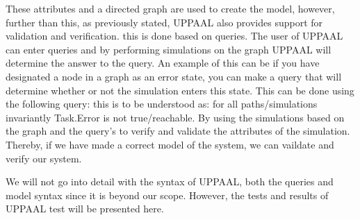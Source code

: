 These attributes and a directed graph are used to create the model, however, further than this, as previously stated, UPPAAL also provides support for validation and verification. this is done based on queries. The user of UPPAAL can enter queries and by performing simulations on the graph UPPAAL will determine the answer to the query. An example of this can be if you have designated a node in a graph as an error state, you can make a query that will determine whether or not the simulation enters this state. This can be done using the following query:  this is to be understood as: for all paths/simulations invariantly Task.Error is not true/reachable. By using the simulations based on the graph and the query's to verify and validate the attributes of the simulation. Thereby, if we have made a correct model of the system, we can vaildate and verify our system.

We will not go into detail with the syntax of UPPAAL, both the queries and model syntax since it is beyond our scope. However, the tests and results of UPPAAL test will be presented here. 




